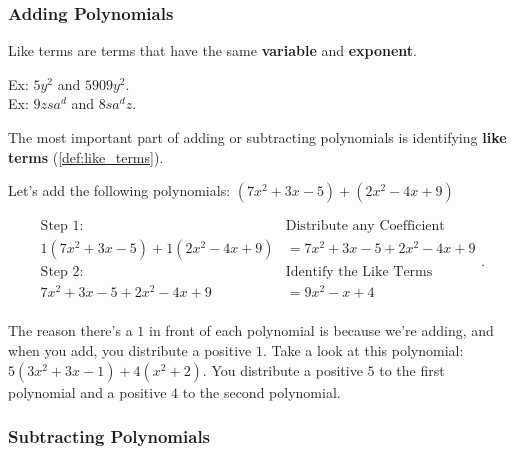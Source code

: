 
\subsubsection{Adding Polynomials}
\label{sub_sub_sec:adding_polynomials}

\begin{definition}
  \label{def:like_terms}

  Like terms are terms that have the same \textbf{variable} and
  \textbf{exponent}. 

  Ex: $5y^{2}$ and $5909y^{2}$. \\
  Ex: $9zsa^{d}$ and $8sa^{d}z$.
\end{definition}

The most important part of adding or subtracting polynomials is identifying \textbf{like
terms} (\ref{def:like_terms}).

\begin{example}
  \label{exm:adding_polynomials}
  Let's add the following polynomials: $(7x^{2} + 3x - 5) + (2x^{2} - 4x + 9)$

  \begin{equation}
    \label{eqt:adding_polynomials}
    \begin{split}
      \textrm{Step $1$:} \quad &\textrm{Distribute any Coefficient} \\
      1(7x^{2} + 3x - 5) + 1(2x^{2} - 4x + 9) &= 7x^{2} + 3x - 5 + 2x^{2} - 4x + 9 \\
      \textrm{Step $2$:} \quad &\textrm{Identify the Like Terms} \\
      7x^{2} + 3x - 5 + 2x^{2} - 4x + 9 &= \boxed{9x^{2} - x + 4} \\
    \end{split}
  .\end{equation}

  The reason there's a $1$ in front of each polynomial is because we're adding,
  and when you add, you distribute a positive $1$. Take a look at this
  polynomial: $5(3x^{2} + 3x - 1) + 4(x^{2} + 2)$. You distribute a positive $5$ 
  to the first polynomial and a positive $4$ to the second polynomial.
\end{example}


\subsubsection{Subtracting Polynomials}
\label{sub_sub_sec:subtracting_polynomials}

